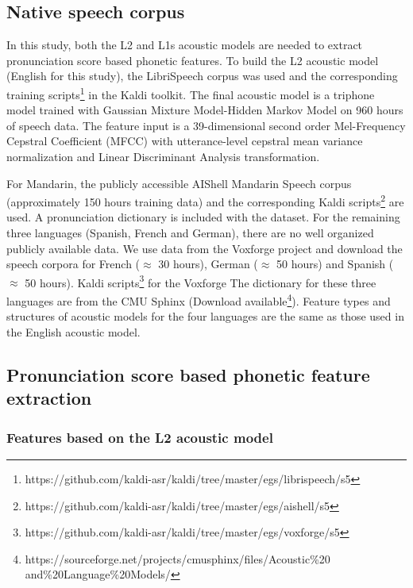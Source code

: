 \subsection{Native speech corpus}
In this study, both the L2 and L1s acoustic models are needed to extract pronunciation score based phonetic features. To build the L2 acoustic model (English for this study), the LibriSpeech corpus \citep{panayotov2015librispeech} was used and the corresponding training scripts\footnote{https://github.com/kaldi-asr/kaldi/tree/master/egs/librispeech/s5} in the Kaldi toolkit. The final acoustic model is a triphone model trained with Gaussian Mixture Model-Hidden Markov Model on 960 hours of speech data. The feature input is a 39-dimensional second order Mel-Frequency Cepstral Coefficient (MFCC) with utterance-level cepstral mean variance normalization and Linear Discriminant Analysis transformation.

For Mandarin, the publicly accessible AIShell Mandarin Speech corpus (approximately 150 hours training data) \citep{bu2017aishell} and the corresponding Kaldi scripts\footnote{https://github.com/kaldi-asr/kaldi/tree/master/egs/aishell/s5} are used. A pronunciation dictionary is included with the dataset. For the remaining three languages (Spanish, French and German), there are no well organized publicly available data. We use data from the Voxforge project and download the speech corpora for French ($\approx$ 30 hours), German ($\approx$ 50 hours) and Spanish ($\approx$ 50 hours). Kaldi scripts\footnote{https://github.com/kaldi-asr/kaldi/tree/master/egs/voxforge/s5} for the Voxforge The dictionary for these three languages are from the CMU Sphinx (Download available\footnote{https://sourceforge.net/projects/cmusphinx/files/Acoustic\%20 \\ \hspace*{4mm} and\%20Language\%20Models/}). Feature types and structures of acoustic models for the four languages are the same as those used in the English acoustic model.

\subsection{Pronunciation score based phonetic feature extraction}
\label{sec:segmental}

\subsubsection{Features based on the L2 acoustic model}
\label{sec:L2_measure}

